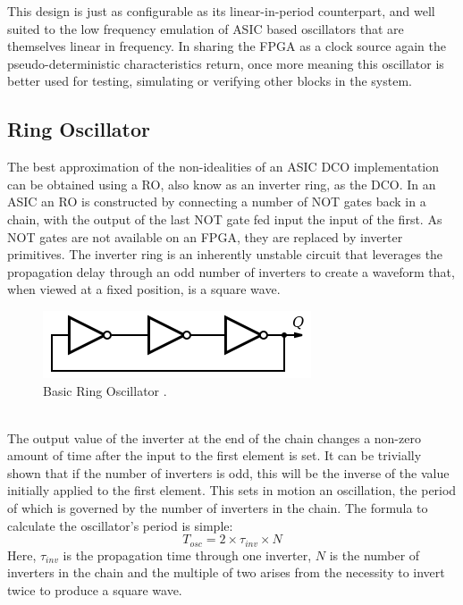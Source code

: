 This design is just as configurable as its linear-in-period counterpart, and well suited to the low frequency emulation of \ac{ASIC} based oscillators that are themselves linear in frequency. In sharing the \ac{FPGA} as a clock source again the pseudo-deterministic characteristics return, once more meaning this oscillator is better used for testing, simulating or verifying other blocks in the system.

\subsection{Ring Oscillator}
The best approximation of the non-idealities of an \ac{ASIC} \ac{DCO} implementation can be obtained using a \ac{RO}, also know as an inverter ring, as the \ac{DCO}. In an \ac{ASIC} an \ac{RO} is constructed by connecting a number of NOT gates back in a chain, with the output of the last NOT gate fed input the input of the first. As NOT gates are not available on an \ac{FPGA}, they are replaced by inverter primitives. The inverter ring is an inherently unstable circuit that leverages the propagation delay through an odd number of inverters to create a waveform that, when viewed at a fixed position, is a square wave. 
\begin{figure}[h]
	\centering
	\includegraphics[scale=0.4]{../RO-wiki}
	\caption{Basic Ring Oscillator \cite{ro_wiki}.}
	\label{fig:ro_wiki}
\end{figure}\\
The output value of the inverter at the end of the chain changes a non-zero amount of time after the input to the first element is set. It can be trivially shown that if the number of inverters is odd, this will be the inverse of the value initially applied to the first element. This sets in motion an oscillation, the period of which is governed by the number of inverters in the chain. The formula to calculate the oscillator's period is simple:
\begin{equation}
	T_{osc} = 2\times \tau_{inv} \times N
\end{equation}
Here, $\tau_{inv}$ is the propagation time through one inverter, $N$ is the number of inverters in the chain and the multiple of two arises from the necessity to invert twice to produce a square wave.

